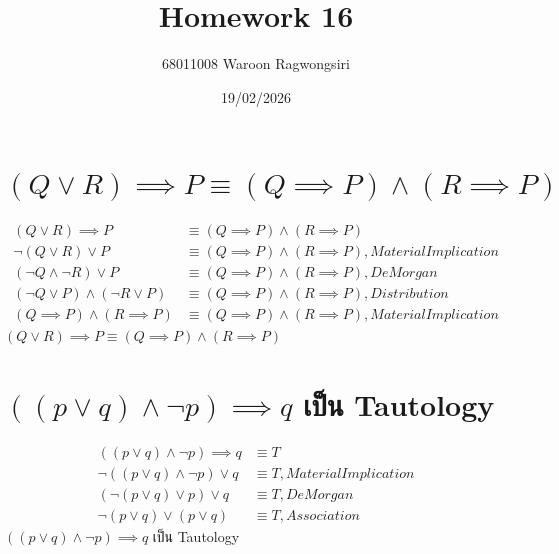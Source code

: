 \documentclass{article}
\title{Homework 16}
\author{68011008 Waroon Ragwongsiri}
\date{19/02/2026}
\begin{document}
\maketitle

{\small
\section{$(Q \lor R) \implies P \equiv (Q \implies P) \land (R \implies P)$}
}
\begin{align}
	(Q \lor R) \implies P &\equiv (Q \implies P) \land (R \implies P) \\
	\neg (Q \lor R) \lor P &\equiv (Q \implies P) \land (R \implies P), Material Implication \\
	(\neg Q \land \neg R) \lor P &\equiv (Q \implies P) \land (R \implies P), De Morgan \\
	(\neg Q \lor P) \land (\neg R \lor P)&\equiv (Q \implies P) \land (R \implies P), Distribution \\
	(Q \implies P) \land (R \implies P)&\equiv (Q \implies P) \land (R \implies P), Material Implication
\end{align}
\therefore $(Q \lor R) \implies P \equiv (Q \implies P) \land (R \implies P)$

\break

{\small
\section{$((p \lor q) \land \neg p) \implies q$ เป็น Tautology}
}
\begin{align}
	((p \lor q) \land \neg p) \implies q &\equiv T \\
	\neg ((p \lor q) \land \neg p) \lor q &\equiv T, Material Implication \\
	(\neg (p \lor q) \lor p) \lor q &\equiv T, De Morgan \\
	\neg (p \lor q) \lor (p \lor q) &\equiv T, Association
\end{align}
\therefore $((p \lor q) \land \neg p) \implies q$ เป็น Tautology
\end{document}
